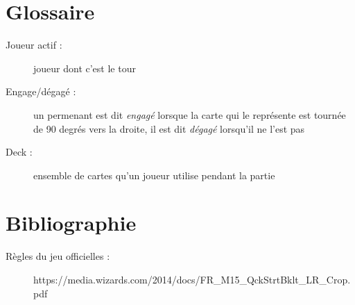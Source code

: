 \documentclass[a4paper,12pt]{article}
\begin{document}
%

\section{Glossaire}

\begin{description}
\item[Joueur actif :] joueur dont c'est le tour
\item[Engage/dégagé :] un permenant est dit \emph{engagé} lorsque la carte qui le représente est tournée de 90 degrés vers la droite, il est dit \emph{dégagé} lorsqu'il ne l'est pas
\item[Deck :] ensemble de cartes qu'un joueur utilise pendant la partie
\end{description}


\section{Bibliographie}

\begin{description}
\item[Règles du jeu officielles :] https://media.wizards.com/2014/docs/FR\_M15\_QckStrtBklt\_LR\_Crop.pdf

\end{description}
\end{document}
